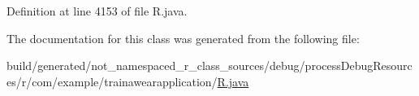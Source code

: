 Definition at line 4153 of file R.\+java.



The documentation for this class was generated from the following file\+:\begin{DoxyCompactItemize}
\item 
build/generated/not\+\_\+namespaced\+\_\+r\+\_\+class\+\_\+sources/debug/process\+Debug\+Resources/r/com/example/trainawearapplication/\mbox{\hyperlink{com_2example_2trainawearapplication_2_r_8java}{R.\+java}}\end{DoxyCompactItemize}
